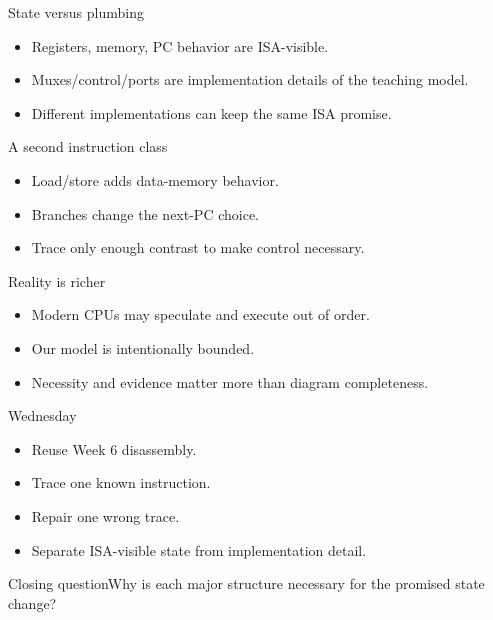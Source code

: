 \documentclass{beamer}
\begin{document}
\begin{frame}{State versus plumbing}\begin{itemize}\item Registers, memory, PC behavior are ISA-visible.\item Muxes/control/ports are implementation details of the teaching model.\item Different implementations can keep the same ISA promise.\end{itemize}\end{frame}
\begin{frame}{A second instruction class}\begin{itemize}\item Load/store adds data-memory behavior.\item Branches change the next-PC choice.\item Trace only enough contrast to make control necessary.\end{itemize}\end{frame}
\begin{frame}{Reality is richer}\begin{itemize}\item Modern CPUs may speculate and execute out of order.\item Our model is intentionally bounded.\item Necessity and evidence matter more than diagram completeness.\end{itemize}\end{frame}
\begin{frame}{Wednesday}\begin{itemize}\item Reuse Week 6 disassembly.\item Trace one known instruction.\item Repair one wrong trace.\item Separate ISA-visible state from implementation detail.\end{itemize}\end{frame}
\begin{frame}{Closing question}\centering\Large Why is each major structure necessary for the promised state change?\end{frame}
\end{document}
